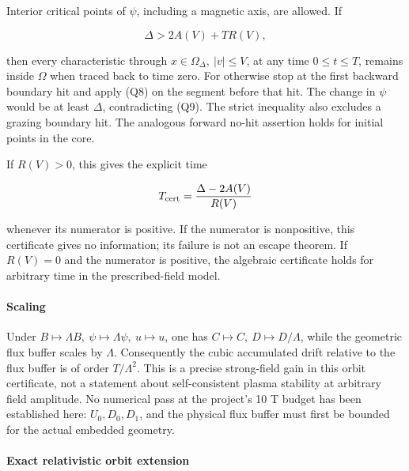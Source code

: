 Interior critical points of \(\psi\), including a magnetic axis, are
allowed. If

\[
\Delta>2A(V)+TR(V),
\tag{Q9}
\]

then every characteristic through \(x\in\Omega_\Delta,\ |v|\le V\), at
any time \(0\le t\le T\), remains inside \(\Omega\) when traced back to
time zero. For otherwise stop at the first backward boundary hit and
apply (Q8) on the segment before that hit. The change in \(\psi\) would
be at least \(\Delta\), contradicting (Q9). The strict inequality also
excludes a grazing boundary hit. The analogous forward no-hit assertion
holds for initial points in the core.

If \(R(V)>0\), this gives the explicit time

\[
T_{\rm cert}=\frac{\Delta-2A(V)}{R(V)}
\]

whenever its numerator is positive. If the numerator is nonpositive,
this certificate gives no information; its failure is not an escape
theorem. If \(R(V)=0\) and the numerator is positive, the algebraic
certificate holds for arbitrary time in the prescribed-field model.

\paragraph{Scaling}\label{scaling}

Under \(B\mapsto\Lambda B,\ \psi\mapsto\Lambda\psi,\ u\mapsto u\), one
has \(C\mapsto C,\ D\mapsto D/\Lambda\), while the geometric flux buffer
scales by \(\Lambda\). Consequently the cubic accumulated drift relative
to the flux buffer is of order \(T/\Lambda^2\). This is a precise
strong-field gain in this orbit certificate, not a statement about
self-consistent plasma stability at arbitrary field amplitude. No
numerical pass at the project's 10 T budget has been established here:
\(U_0,D_0,D_1\), and the physical flux buffer must first be bounded for
the actual embedded geometry.

\paragraph{Exact relativistic orbit
extension}\label{exact-relativistic-orbit-extension}

